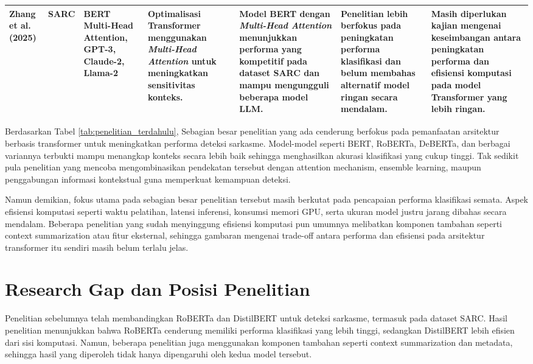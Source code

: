 \begin{table}[H]
{\begin{tabular}{|p{2.8cm}|p{2.5cm}|p{2.5cm}|p{3cm}|p{3.2cm}|p{3cm}|p{3cm}|}
Zhang et al. (2025)
&
SARC
&
BERT Multi-Head Attention, GPT-3, Claude-2, Llama-2
&
Optimalisasi Transformer menggunakan \textit{Multi-Head Attention} untuk meningkatkan sensitivitas konteks.
&
Model BERT dengan \textit{Multi-Head Attention} menunjukkan performa yang kompetitif pada dataset SARC dan mampu mengungguli beberapa model LLM.
&
Penelitian lebih berfokus pada peningkatan performa klasifikasi dan belum membahas alternatif model ringan secara mendalam.
&
Masih diperlukan kajian mengenai keseimbangan antara peningkatan performa dan efisiensi komputasi pada model Transformer yang lebih ringan.
\\
\hline

\end{tabular}
}
\end{table}


Berdasarkan Tabel \ref{tab:penelitian_terdahulu}, Sebagian besar penelitian yang ada cenderung berfokus pada pemanfaatan arsitektur berbasis transformer untuk meningkatkan performa deteksi sarkasme. Model-model seperti BERT, RoBERTa, DeBERTa, dan berbagai variannya terbukti mampu menangkap konteks secara lebih baik sehingga menghasilkan akurasi klasifikasi yang cukup tinggi. Tak sedikit pula penelitian yang mencoba mengombinasikan pendekatan tersebut dengan attention mechanism, ensemble learning, maupun penggabungan informasi kontekstual guna memperkuat kemampuan deteksi.

Namun demikian, fokus utama pada sebagian besar penelitian tersebut masih berkutat pada pencapaian performa klasifikasi semata. Aspek efisiensi komputasi seperti waktu pelatihan, latensi inferensi, konsumsi memori GPU, serta ukuran model justru jarang dibahas secara mendalam. Beberapa penelitian yang sudah menyinggung efisiensi komputasi pun umumnya melibatkan komponen tambahan seperti context summarization atau fitur eksternal, sehingga gambaran mengenai trade-off antara performa dan efisiensi pada arsitektur transformer itu sendiri masih belum terlalu jelas.

\section{Research Gap dan Posisi Penelitian}

Penelitian sebelumnya telah membandingkan RoBERTa dan DistilBERT untuk deteksi sarkasme, termasuk pada dataset SARC. Hasil penelitian menunjukkan bahwa RoBERTa cenderung memiliki performa klasifikasi yang lebih tinggi, sedangkan DistilBERT lebih efisien dari sisi komputasi. Namun, beberapa penelitian juga menggunakan komponen tambahan seperti context summarization dan metadata, sehingga hasil yang diperoleh tidak hanya dipengaruhi oleh kedua model tersebut.

